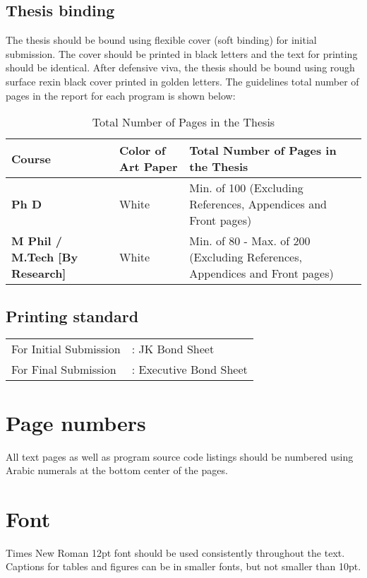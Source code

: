 \subsection{Thesis binding}
The thesis should be bound using flexible cover (soft binding) for initial submission. The cover should be printed in black letters and the text for printing should be identical. After defensive viva, the thesis should be bound using rough surface rexin black cover printed in golden letters. The guidelines total number of pages in the report for each program
is shown below:
\begin{table}[htb]
\fontsize{10}{12}\selectfont
	\caption{Total Number of Pages in the Thesis}
	\begin{tabular}{|L{3cm}|L{2cm}|L{8cm}|}
		\hline
		\textbf{Course}	& \textbf{Color of Art Paper} & \textbf{Total Number of Pages in the Thesis} \\ \hline
		\textbf{Ph D} &	White &	Min. of 100 (Excluding References, Appendices and Front pages) \\\hline
		\textbf{M Phil / M.Tech [By Research]} & White & Min. of 80 - Max. of  200 (Excluding References, Appendices and Front pages) \\ \hline
	\end{tabular}	
\end{table}

\subsection{Printing standard}
\begin{table}[htb]
	\begin{tabular}{ll}
		For Initial Submission &: JK Bond Sheet \\
		For Final Submission &: Executive Bond Sheet
		
	\end{tabular}	
\end{table}

\section{Page numbers}
All text pages as well as program source code listings should be numbered using Arabic numerals at the bottom center of the pages.

\section{Font}
Times New Roman 12pt font should be used consistently throughout the text. Captions for tables and figures can be in smaller fonts, but not smaller than 10pt.

